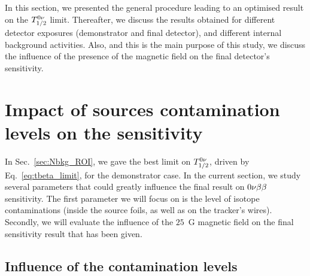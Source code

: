 In this section, we presented the general procedure leading to an optimised result on the $T_{1/2}^{0\nu}$ limit.
Thereafter, we discuss the results obtained for different detector exposures (demonstrator and final detector), and different internal background activities.
Also, and this is the main purpose of this study, we discuss the influence of the presence of the magnetic field on the final detector's sensitivity.


\section{Impact of sources contamination levels on the sensitivity}
\label{sec:demonstrator_sensitivity}

In Sec.~\ref{sec:Nbkg_ROI}, we gave the best limit on $T_{1/2}^{0\nu}$, driven by Eq.~\eqref{eq:tbeta_limit}, for the demonstrator case.
In the current section, we study several parameters that could greatly influence the final result on $0\nu\beta\beta$ sensitivity.
The first parameter we will focus on is the level of isotope contaminations (inside the source foils, as well as on the tracker's wires).
Secondly, we will evaluate the influence of the $25$~G magnetic field on the final sensitivity result that has been given.

\subsection{Influence of the contamination levels}

